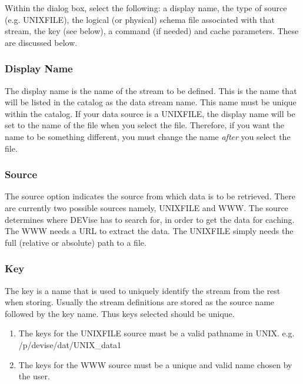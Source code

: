 Within the dialog box, select the following: a display name, the type of
source (e.g. UNIXFILE), the logical (or physical) schema file associated
with that stream, the key (see below), a command (if needed) and cache
parameters. These are discussed below.


\subsubsection{Display Name}

The display name is the name of the stream to be defined. This is the name
that will
be listed in the catalog as the data stream name. This name must be unique
within the catalog.  If your data source is a UNIXFILE, the display name will
be set to the name of the file when you select the file.  Therefore, if you
want the name to be something different, you must change the name {\em after}
you select the file.

\subsubsection{Source}

The source option indicates the source from which data is to be retrieved.
There are currently two possible sources namely, UNIXFILE and WWW.
The source determines where DEVise has to search for, in
order to get the data for caching.
The WWW needs a URL to extract the data. The UNIXFILE simply needs the full
(relative or absolute) path to a file.

\subsubsection{Key}

The key is a name that is used to uniquely identify the stream from the rest
when storing. Usually the stream definitions are stored as the source name
followed by the key name. Thus keys selected should be unique.

\begin{enumerate}
\item
The keys for the UNIXFILE source must be a valid pathname in UNIX.
e.g. /p/devise/dat/UNIX\_data1

\item
The keys for the WWW source must be a unique and valid
name chosen by the user.
\end{enumerate}

